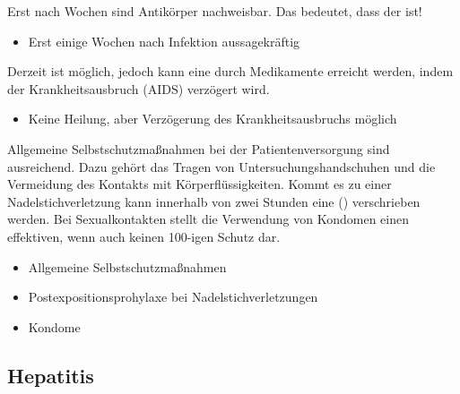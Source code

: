 {%
Erst nach  Wochen sind Antikörper nachweisbar.
Das bedeutet, dass der  ist!
}
{%
\begin{itemize}
  \item Erst einige Wochen nach Infektion aussagekräftig
\end{itemize}
}
{}
{}
{}

{%
Derzeit ist  möglich, jedoch
  kann eine  durch
  Medikamente erreicht werden, indem der Krankheitsausbruch
  (AIDS) verzögert wird.

}
{
\begin{itemize}
  \item Keine Heilung, aber Verzögerung des
  Krankheitsausbruchs möglich
\end{itemize}
}
{}
{}
{}
\SlideCompensation{}

{%
Allgemeine Selbstschutzmaßnahmen bei der
Patientenversorgung sind ausreichend. Dazu gehört das
Tragen von Untersuchungshandschuhen und die Vermeidung
des Kontakts mit Körperflüssigkeiten. Kommt es zu einer
Nadelstichverletzung kann innerhalb von zwei Stunden eine
 () verschrieben werden.
Bei Sexualkontakten stellt die Verwendung von Kondomen einen
effektiven, wenn auch keinen 100\PC*-igen Schutz dar.

}
{
\begin{itemize}
  \item Allgemeine Selbstschutzmaßnahmen 
  \item Postexpositionsprohylaxe bei Nadelstichverletzungen
  \item Kondome
\end{itemize}
}
{}
{}
{}



\clearpage
\subsection{Hepatitis}
\label{topic:hepatitis-virale}%
\label{topic:hepatitis-toxisch}%
\label{topic:hepatitis}%
%
%




